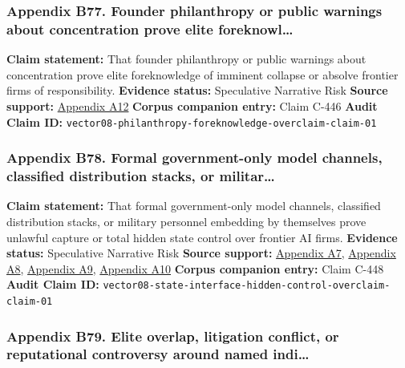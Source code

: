 \documentclass[
  american,
  11pt,
  letterpaper,
]{article}
\begin{document}
\subsubsection{Appendix B77. Founder philanthropy or public warnings
about concentration prove elite
foreknowl\ldots{}}\label{appendix-b77-founder-philanthropy-or-public-warnings-about-concentration-prove-elite-foreknowl}

\textbf{Claim statement:} That founder philanthropy or public warnings
about concentration prove elite foreknowledge of imminent collapse or
absolve frontier firms of responsibility. \textbf{Evidence status:}
Speculative Narrative Risk \textbf{Source support:}
\hyperref[appendix-a12-the-adolescence-of-technology]{Appendix A12}
\textbf{Corpus companion entry:} Claim C-446 \textbf{Audit Claim ID:}
\texttt{vector08-philanthropy-foreknowledge-overclaim-claim-01}

\subsubsection{Appendix B78. Formal government-only model channels,
classified distribution stacks, or
militar\ldots{}}\label{appendix-b78-formal-government-only-model-channels-classified-distribution-stacks-or-militar}

\textbf{Claim statement:} That formal government-only model channels,
classified distribution stacks, or military personnel embedding by
themselves prove unlawful capture or total hidden state control over
frontier AI firms. \textbf{Evidence status:} Speculative Narrative Risk
\textbf{Source support:}
\hyperref[appendix-a7-introducing-openai-for-government]{Appendix A7},
\hyperref[appendix-a8-claude-gov-models-for-u-s-national-security-customers]{Appendix
A8},
\hyperref[appendix-a9-anthropic-and-palantir-partner-to-bring-claude-ai-models-to-aws-for-u-s-government-intelligence-and-defense-operations]{Appendix
A9},
\hyperref[appendix-a10-army-launches-detachment-201-executive-innovation-corps-to-drive-tech-transformation]{Appendix
A10} \textbf{Corpus companion entry:} Claim C-448 \textbf{Audit Claim
ID:} \texttt{vector08-state-interface-hidden-control-overclaim-claim-01}

\subsubsection{Appendix B79. Elite overlap, litigation conflict, or
reputational controversy around named
indi\ldots{}}\label{appendix-b79-elite-overlap-litigation-conflict-or-reputational-controversy-around-named-indi}
\end{document}
